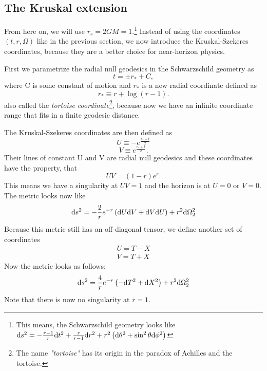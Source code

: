 \subsection{The Kruskal extension \checkmark}
	\FloatBarrier
	From here on, we will use $r_{s}=2GM=1$.\footnote{This means, the Schwarzschild geometry looks like $\mathrm{d} s^2=-\frac{r-1}{r} \mathrm{d} t^2+\frac{r}{r-1}
		\mathrm{d} r^2+r^2 \left( \mathrm{d} \theta^2+\sin^2\theta \mathrm{d} \phi^2 \right)$}
	Instead of using the coordinates $(t,r,\Omega)$ like in the previous section, we now introduce the Kruskal-Szekeres coordinates, because they are a better choice for near-horizon physics.
	
	First we parametrize the radial null geodesics in the Schwarzschild geometry as
		\begin{equation}
			t=\pm r_{*} + C,
		\end{equation}
	where C is some constant of motion and $r_{*}$ is a new radial coordinate defined as
		\begin{equation} \label{r_*tortoise}
			r_{*}\equiv r+\log (r-1).
		\end{equation}
	also called the \textit{tortoise coordinate}\footnote{The name \textit{"tortoise"} has its origin in the paradox of Achilles and the tortoise.}, because now we have an infinite coordinate range that fits in a finite geodesic distance.
		
	The Kruskal-Szekeres coordinates are then defined as
		\begin{equation}
			U\equiv -e^{\frac{r_*-t}{2}} \label{U}
		\end{equation}
		\begin{equation}
			V\equiv e^{\frac{r_*+t}{2}}.
		\end{equation}
	Their lines of constant U and V are radial null geodesics and these coordinates have the property, that
		\begin{equation}
			 UV=(1-r)e^r.
		\end{equation}
	This means we have a singularity at $UV=1$ and the horizon is at $U=0$ or $V=0$. The metric looks now like
		\begin{equation}
			\mathrm{d} s^2=-\frac{2}{r}e^{-r}\left(\mathrm{d} U \mathrm{d} V + \mathrm{d} V \mathrm{d} U\right)+r^2 \mathrm{d} \Omega^2_{2}
		\end{equation}
	Because this metric still has an off-diagonal tensor, we define another set of coordinates
		\begin{equation}
		\begin{split}
			U=T-X 	\\	
			V=T+X
		\end{split}
		\end{equation}
	Now the metric looks as follows:
		\begin{equation}\label{SchXT}
			\mathrm{d} s^2=\frac{4}{r}e^{-r}\left(- \mathrm{d} T^2+ \mathrm{d} X^2\right)+r^2 \mathrm{d} \Omega^2_2
		\end{equation}
	Note that there is now no singularity at $r=1$.
	
